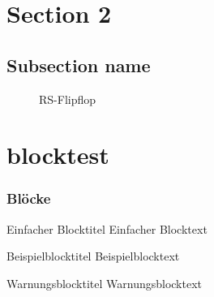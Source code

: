 \documentclass[11pt]{beamer}
\begin{document}
\section{Section 2}
\subsection{Subsection name}
\begin{frame}
    \begin{figure}[!htb]
      \centering
          \caption{RS-Flipflop}%
          \label{fig:rsflipflop}
        \endminipage\hspace{1cm}   
          \caption{}%
          \label{fig:rsflipfloptakt}
        \endminipage
    \end{figure}
\end{frame}

\section{blocktest}
\begin{frame}
	\frametitle{Blöcke}

    \begin{block}{Einfacher Blocktitel}
        Einfacher Blocktext
    \end{block}
    
    \begin{exampleblock}{Beispielblocktitel}
         Beispielblocktext
    \end{exampleblock}
   
    \begin{alertblock}{Warnungsblocktitel}
         Warnungsblocktext
    \end{alertblock}
    
\end{frame}
\end{document}
